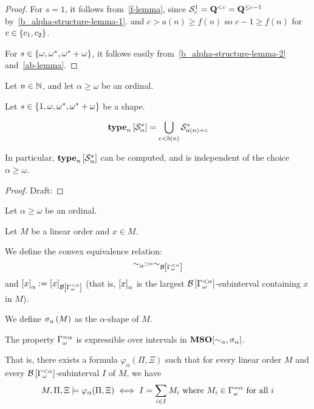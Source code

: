 \begin{proof}
  For $s = 1$, it follows from~\cref{f-lemma}, since $\mathcal{S}^{1}_{c} = \mathbf{Q}^{< c} = \mathbf{Q}^{\le c-1}$
  by~\cref{b_alpha-structure-lemma-1}.
  and $c > a(n) \ge f(n)$ so $c-1 \ge f(n)$ for $c \in \left\{ {c_1, c_2} \right\}$.

  For $s \in \left\{ {\omega, \omega^\ast, \omega^\ast + \omega} \right\}$, it follows easily from~\cref{b_alpha-structure-lemma-2}
  and~\cref{ab-lemma}.
\end{proof}

\begin{lemma}
  Let $n \in \mathbb{N}$, and let $\alpha \ge \omega$ be an ordinal.

  Let $s \in \left\{ {1, \omega, \omega^\ast, \omega^\ast + \omega} \right\}$ be a shape.

  \[\mathbf{type}_{n} \left[ {\mathcal{S}^{s}_{\alpha}} \right] = \bigcup_{c < b(n)}{\mathcal{S}^{s}_{a(n) + c}                                                                                                                                                                                                                                                                                                                                                                                                                                       }\]

  In particular, $\mathbf{type}_{n} \left[ {\mathcal{S}^{s}_{\alpha}} \right]$ can be
  computed, and is independent of the choice $\alpha \ge \omega$.
\end{lemma}

\begin{proof}
  Draft:
  
\end{proof}

\begin{definition}
  Let $\alpha \ge \omega$ be an ordinal.

  Let $M$ be a linear order and $x \in M$.

  We define the convex equivalence relation: 
  \[\sim_\alpha := \sim_{\mathcal{B} \left[ {{\Gamma_{\omega}^{< \alpha}}} \right]}\]
  and $\left[ {x} \right]_{\alpha} := \left[ {x} \right]_{\mathcal{B} \left[ {{\Gamma_{\omega}^{< \alpha}}} \right]}$ (that is,
  $\left[ {x} \right]_{\alpha}$ is the largest $\mathcal{B} \left[ {{\Gamma_{\omega}^{< \alpha}}} \right]$-subinterval
  containing $x$ in $M$).

  We define $\sigma_{\alpha} \left( {M} \right)$ as
  the $\alpha$-shape of $M$.
\end{definition}


\begin{lemma}
  The property
  $\Gamma_{\omega}^{= \alpha}$ is expressible over intervals
  in $\mathbf{MSO}[\sim_{\alpha}, \sigma_{\alpha}]$.

  That is, there exists a formula $\varphi_{\alpha}(\Pi, \Xi)$
  such that for every linear order $M$ and every $\mathcal{B} \left[ {{\Gamma_{\omega}^{< \alpha}}} \right]$-subinterval
  $I$ of $M$, we have
  \[
    M, \Pi, \Xi \models \varphi_{\alpha}(\Pi, \Xi) \iff
    I = \sum_{i \in I} M_i
    \text{ where } M_i \in \Gamma_{\omega}^{= \alpha} \text{ for all } i
  \]
\end{lemma}

